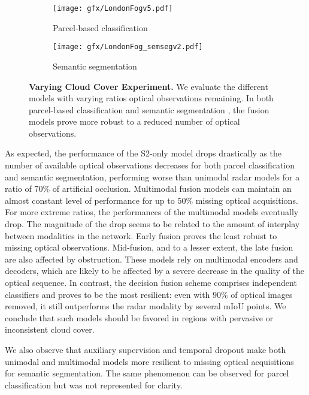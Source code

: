\begin{figure}[h!]
    \centering
    \begin{subfigure}{\linewidth}
    \centering
    \texttt{[image: gfx/LondonFogv5.pdf]}
    \caption{Parcel-based classification}
    \label{fig:london:parcel}
    \end{subfigure}
    \vfill
    \begin{subfigure}{\linewidth}
    \centering
    \texttt{[image: gfx/LondonFog\_semsegv2.pdf]}
    \caption{Semantic segmentation}
    \label{fig:london:semantic}
    \end{subfigure}
    \caption{\textbf{Varying Cloud Cover Experiment.} We {evaluate} the different models with {varying} ratios optical observations {remaining}. In both parcel-based classification  and semantic segmentation , the fusion models prove more robust to a reduced number of optical observations.  }
    \label{fig:london}
\end{figure} 

As expected, the performance of the S2-only model drops drastically as the number of available optical observations decreases for both parcel classification and semantic segmentation, performing worse than unimodal radar models for {a ratio of} $70$\% of artificial occlusion. 
Multimodal fusion models can maintain an almost constant level of performance for up to $50$\% missing optical acquisitions. For more extreme ratios, the performances of the multimodal models eventually drop. The magnitude of the drop seems to be related to the amount of interplay between modalities in the network.
{Early fusion proves the least robust to missing optical observations.} Mid-fusion, and to a lesser extent, the late fusion are also affected by obstruction. These models rely on multimodal encoders and decoders, which are likely to be affected by a severe decrease in the quality of the optical sequence. In contrast, the decision fusion scheme comprises independent classifiers and proves to be the most resilient: even with $90$\% of optical images removed, it still outperforms the radar modality by several mIoU points.
We conclude that such models should be favored in regions with pervasive or inconsistent cloud cover.

We also observe that auxiliary supervision and temporal dropout make both unimodal and multimodal models  more resilient to missing optical acquisitions for semantic segmentation. The same phenomenon can be observed for parcel classification but was not represented for clarity.


